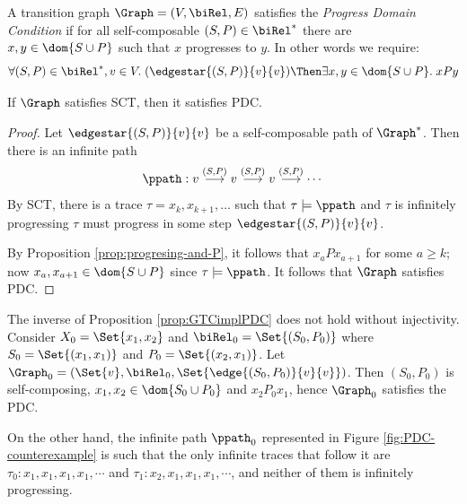 \begin{definition}\label{def:PDC}
A transition graph $\Graph = (V,\biRel,E)$ 
satisfies the {\em Progress Domain Condition} 
if for all self-composable $(S,P) \in \biRel^*$ there are $x, y \in  \dom{S \cup P}$ such that
$x$ progresses to $y$. In other words we require:
\[\forall (S,P) \in \biRel^*, v \in V.\; (\edgestar{(S,P)}{v}{v}) \Then \exists x, y \in \dom{S \cup P}.\; x P y \]
\end{definition}



\begin{proposition}\label{prop:GTCimplPDC}
If $\Graph$ satisfies SCT, then it satisfies PDC.
\end{proposition}

\begin{proof}
Let $\edgestar{(S,P)}{v}{v}$ be a self-composable path of $\Graph^*$. 
Then there is an infinite path
\[\ppath : v \stackrel{(S,P)}{\longrightarrow} v \stackrel{(S,P)}{\longrightarrow} v \stackrel{(S,P)}{\longrightarrow}\cdots\]
By SCT, there is a trace $\tau = x_k, x_{k+1}, \ldots$ such that $\tau\models\ppath$ 
and $\tau$ is infinitely progressing
$\tau$ must progress in some step $\edgestar{(S,P)}{v}{v}$.

By Proposition \ref{prop:progresing-and-P}, it follows that $x_a P x_{a+1}$ for some 
$a \ge k$; now $x_a, x_{a+1} \in \dom{S \cup P}$ since
$\tau\models \ppath$. It follows that $\Graph$ satisfies PDC.
\end{proof}

\begin{remark}\label{rem:PDCnotGTC}
The inverse of Proposition \ref{prop:GTCimplPDC} does not hold without injectivity. 
Consider $X_0 = \Set{x_1, x_2}$ and $\biRel_0 = \Set{(S_0,P_0)}$ where
$S_0 = \Set{(x_1, x_1)}$ and $P_0 = \Set{(x_2, x_1)}$. Let $\Graph_0 = (\Set{v}, \biRel_0, \Set{\edge{(S_0,P_0)}{v}{v}})$. Then $(S_0,P_0)$
is self-composing, $x_1, x_2 \in \dom{S_0 \cup P_0}$ and $x_2 P_0 x_1$, hence $\Graph_0$ satisfies the PDC.

On the other hand, the infinite path $\ppath_0$ represented in Figure \ref{fig:PDC-counterexample} is such that the only infinite traces that follow it are
$\tau_0 : x_1 , x_1, x_1, x_1, \cdots$ and $\tau_1 : x_2, x_1 , x_1, x_1, \cdots$, 
and neither of them is infinitely progressing. 
\end{remark}

